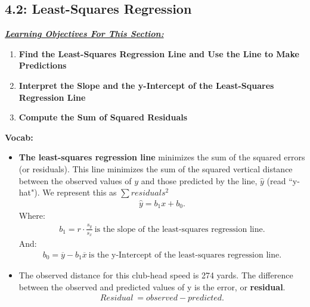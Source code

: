 \documentclass{report}
\begin{document}
    \pagebreak \bigbreak \noindent
    \subsection{4.2: Least-Squares Regression}
    \bigbreak \noindent 
    \textbf{\textit{\underline{Learning Objectives For This Section:}}}
    \begin{enumerate}
        \item \textbf{Find the Least-Squares Regression Line and Use the Line to Make Predictions}
        \item \textbf{Interpret the Slope and the y-Intercept of the Least-Squares Regression Line}
        \item \textbf{Compute the Sum of Squared Residuals}
    \end{enumerate}
    \textbf{Vocab:}
    \begin{itemize}
        \item \textbf{The least-squares regression line} minimizes the sum of the squared errors (or residuals). This line minimizes the sum of the squared vertical distance between the observed values of $y$  and those predicted by the line, $\hat{y}$  (read “y-hat"). We represent this as $\sum residuals^{2}$
            \begin{align*}
               \hat{y} = b_{1}x + b_{0} 
            .\end{align*}
            Where:
            \begin{align*}
                b_{1} = r \cdot \frac{s_{y}}{s_{x}}\ \text{is the slope of the least-squares regression line}
            .\end{align*}
            And:
            \begin{align*}
                b_{0} = \overline{y} -b_{1}\overline{x}\ \text{is the y-Intercept of the least-squares regression line} 
            .\end{align*}
        \item The observed distance for this club-head speed is 274 yards. The difference between the observed and predicted values of y is the error, or \textbf{residual}.
            \begin{align*}
                Residual\ = observed - predicted
            .\end{align*}


    \end{itemize}
\end{document}
